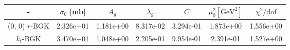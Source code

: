 \begin{tabular}{|c|c|c|c|c|c|c|}
\hline - & $\sigma_0 $ [mb] & $A_g$ & $\lambda_g$ & $C$ & $\mu_0^2 \left[\mathrm{GeV^2}\right]$ & $\chi^2/\mathrm{dof}$ \\\hline 
\color{gray} (0, 0) {\footnotesize $r$-BGK} & 2.326e+01& 1.181e+00& 8.317e-02& 3.294e-01& 1.873e+00& 1.556e+00\\\hline 
{\footnotesize $k_t$-BGK} & 3.470e+01& 1.048e+00& 2.205e-01& 9.954e-01& 2.391e-01& 1.527e+00\\\hline 
\end{tabular}